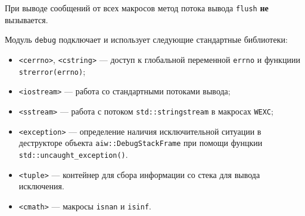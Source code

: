 При выводе сообщений от всех макросов метод потока вывода \verb'flush' {\bf не} вызывается. 

Модуль \verb'debug' подключает и использует следующие стандартные библиотеки:
\begin{itemize}
\item \verb'<cerrno>', \verb'<cstring>' --- доступ к глобальной переменной \verb'errno' и функциии \verb'strerror(errno)';  
\item \verb'<iostream>' --- работа со стандартными потоками вывода;
\item \verb'<sstream>' --- работа с потоком \verb'std::stringstream' в макросах \verb'WEXC';
\item \verb'<exception>' --- определение наличия исключительной ситуации в деструкторе объекта \verb'aiw::DebugStackFrame'
  при помощи фунцкии \verb'std::uncaught_exception()'.
\item \verb'<tuple>' --- контейнер для сбора информации со стека для вывода исключения.
\item \verb'<cmath>' --- макросы \verb'isnan' и \verb'isinf'.
\end{itemize}


 
